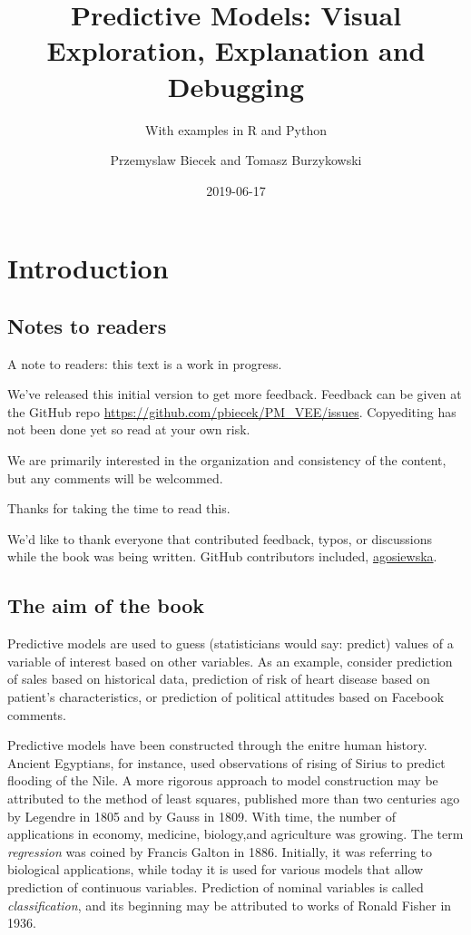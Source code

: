 \documentclass[12pt,]{krantz}
\title{Predictive Models: Visual Exploration, Explanation and Debugging}
\subtitle{With examples in R and Python}
\author{Przemyslaw Biecek and Tomasz Burzykowski}
\date{2019-06-17}
\theoremstyle{definition}
\theoremstyle{definition}
\theoremstyle{definition}
\theoremstyle{remark}
\begin{document}
\maketitle

{
\hypersetup{linkcolor=black}
\setcounter{tocdepth}{2}
\tableofcontents
}
\listoftables
\listoffigures
\hypertarget{introduction}{%
\section{Introduction}\label{introduction}}

\hypertarget{notes-to-readers}{%
\subsection{Notes to readers}\label{notes-to-readers}}

A note to readers: this text is a work in progress.

We've released this initial version to get more feedback. Feedback can
be given at the GitHub repo
\url{https://github.com/pbiecek/PM_VEE/issues}. Copyediting has not been
done yet so read at your own risk.

We are primarily interested in the organization and consistency of the
content, but any comments will be welcommed.

Thanks for taking the time to read this.

We'd like to thank everyone that contributed feedback, typos, or
discussions while the book was being written. GitHub contributors
included, \href{https://github.com/agosiewska/}{agosiewska}.

\hypertarget{the-aim-of-the-book}{%
\subsection{The aim of the book}\label{the-aim-of-the-book}}

Predictive models are used to guess (statisticians would say: predict)
values of a variable of interest based on other variables. As an
example, consider prediction of sales based on historical data,
prediction of risk of heart disease based on patient's characteristics,
or prediction of political attitudes based on Facebook comments.

Predictive models have been constructed through the enitre human
history. Ancient Egyptians, for instance, used observations of rising of
Sirius to predict flooding of the Nile. A more rigorous approach to
model construction may be attributed to the method of least squares,
published more than two centuries ago by Legendre in 1805 and by Gauss
in 1809. With time, the number of applications in economy, medicine,
biology,and agriculture was growing. The term \emph{regression} was
coined by Francis Galton in 1886. Initially, it was referring to
biological applications, while today it is used for various models that
allow prediction of continuous variables. Prediction of nominal
variables is called \emph{classification}, and its beginning may be
attributed to works of Ronald Fisher in 1936.
\end{document}
